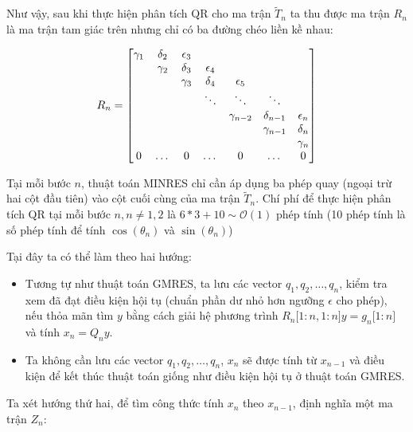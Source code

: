\documentclass[14pt, a4paper]{article}
\numberwithin{equation}{section}
\numberwithin{algorithm}{section}
\numberwithin{figure}{section}
\numberwithin{dl}{section}
\numberwithin{md}{section}
\numberwithin{bd}{section}
\numberwithin{dn}{section}
\begin{document}
Như vậy, sau khi thực hiện phân tích QR cho ma trận $\widetilde{T}_n$ ta thu được ma trận $R_n$ là ma trận tam giác trên nhưng chỉ có ba đường chéo liền kề nhau:

\begin{equation}
    R_n = \begin{bmatrix}
        \gamma_1 & \delta_2 & \epsilon_3 & \space & \space & \space & \space \\
        \space & \gamma_2 & \delta_3 & \epsilon_4 & \space & \space & \space \\
        \space & \space  & \gamma_3 & \delta_4 & \epsilon_5 & \space & \space \\
        \space & \space & \space & \ddots & \ddots & \ddots & \space \\
        \space & \space & \space & \space & \gamma_{n-2} & \delta_{n-1} & \epsilon_n \\
        \space & \space & \space & \space & \space & \gamma_{n-1} & \delta_n \\
        \space & \space & \space & \space & \space & \space & \gamma_n \\
        0 & \dots & 0 & \dots & 0 & \dots & 0
    \end{bmatrix}
\end{equation}

Tại mỗi bước $n$, thuật toán MINRES chỉ cần áp dụng ba phép quay (ngoại trừ hai cột đầu tiên) vào cột cuối cùng của ma trận $\widetilde{T}_n$. Chí phí để thực hiện phân tích QR tại mỗi bước $n, n \neq 1, 2$ là $6*3 + 10 \sim \mathcal{O}(1)$ phép tính (10 phép tính là số phép tính để tính $\cos(\theta_n)$ và $\sin(\theta_n)$)

Tại đây ta có thể làm theo hai hướng:

\begin{itemize}
    \item Tương tự như thuật toán GMRES, ta lưu các vector $q_1, q_2, \dots, q_n$, kiểm tra xem đã đạt điều kiện hội tụ (chuẩn phần dư nhỏ hơn ngưỡng $\epsilon$ cho phép), nếu thỏa mãn tìm $y$ bằng cách giải hệ phương trình $R_n\lbrack 1:n, 1:n\rbrack y=g_n\lbrack 1:n \rbrack$ và tính $x_n=Q_n y$.
    \item Ta không cần lưu các vector $q_1, q_2, \dots, q_n$, $x_n$ sẽ được tính từ $x_{n-1}$ và điều kiện để kết thúc thuật toán giống như điều kiện hội tụ ở thuật toán GMRES.
\end{itemize}

Ta xét hướng thứ hai, để tìm công thức tính $x_n$ theo $x_{n-1}$, \cite{greenbaum1997iterative} định nghĩa một ma trận $Z_n$:
\end{document}
